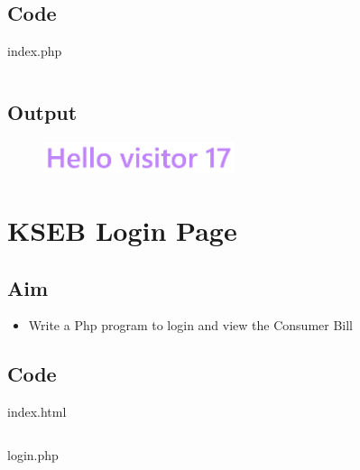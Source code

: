 \documentclass{article}
\begin{document}
\subsection{Code}
index.php
\inputminted[frame=lines, breaklines, breakanywhere, numberblanklines=false]{php}{./prog_22/index.php}

\subsection{Output}
\begin{figure}[h!]
	\centering
	\includegraphics[width=0.5\textwidth]{./Assets/p22.png}
\end{figure}
\newpage

\section{KSEB Login Page}
\subsection{Aim}
\begin{itemize}
  \item Write a Php program to login and view the Consumer Bill
\end{itemize}

\subsection{Code}
index.html
\inputminted[frame=lines, breaklines, breakanywhere, numberblanklines=false]{html}{./prog_23/index.html}
login.php
\inputminted[frame=lines, breaklines, breakanywhere, numberblanklines=false]{php}{./prog_23/login.php}
\end{document}
